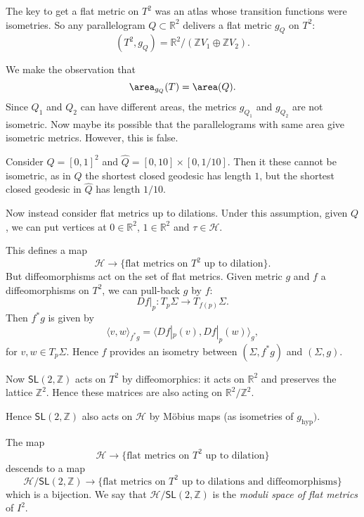 \documentclass[12pt]{article}
\begin{document}
The key to get a flat metric on $T^2$ was an atlas whose transition functions were isometries. So any parallelogram $Q \subset \mathbb{R}^2$ delivers a flat metric $g_Q$ on $T^2$:
\[
	(T^2, g_Q) = \mathbb{R}^2/(\mathbb{Z} V_1 \oplus \mathbb{Z} V_2).
\]

We make the observation that
\[
	\area_{g_Q}(T) = \area(Q).
\]
Since $Q_1$ and $Q_2$ can have different areas, the metrics $g_{Q_1}$ and $g_{Q_2}$ are not isometric. Now maybe its possible that the parallelograms with same area give isometric metrics. However, this is false.%

Consider $Q = [0, 1]^2$ and $\hat Q = [0, 10] \times [0, 1/10]$. Then it these cannot be isometric, as in $Q$ the shortest closed geodesic has length $1$, but the shortest closed geodesic in $\hat Q$ has length $1/10$.

Now instead consider flat metrics up to dilations. Under this assumption, given $Q$, we can put vertices at $0 \in \mathbb{R}^2$, $1 \in \mathbb{R}^2$ and $\tau \in \mathcal{H}$.

This defines a map
\[
	\mathcal{H} \to \{\text{flat metrics on } T^2 \text{ up to dilation}\}.
\]
But diffeomorphisms act on the set of flat metrics. Given metric $g$ and $f$ a diffeomorphisms on $T^2$, we can pull-back $g$ by $f$:
\[
	Df|_p : T_p \Sigma \to T_{f(p)}\Sigma.
\]
Then $f^{*}g$ is given by
\[
\langle v, w\rangle_{f^{*}g} = \langle Df|_p(v), Df|_p(w)\rangle_g,
\]
for $v, w \in T_p \Sigma$. Hence $f$ provides an isometry between $(\Sigma, f^{*}g)$ and $(\Sigma, g)$.

Now $\mathsf{SL}(2, \mathbb{Z})$ acts on $T^2$ by diffeomorphics: it acts on $\mathbb{R}^2$ and preserves the lattice $\mathbb{Z}^2$. Hence these matrices are also acting on $\mathbb{R}^2/\mathbb{Z}^2$.

Hence $\mathsf{SL}(2, \mathbb{Z})$ also acts on $\mathcal{H}$ by M\"{o}bius maps (as isometries of $g_\mathrm{hyp})$.

\begin{theorem}
	The map
	\[
		\mathcal{H} \to \{\text{flat metrics on } T^2 \text{ up to dilation}\}
	\]
	descends to a map
	\[
		\mathcal{H} / \mathsf{SL}(2, \mathbb{Z}) \to \{\text{flat metrics on } T^2 \text{ up to dilations and diffeomorphisms}\}
	\]
	which is a bijection. We say that $\mathcal{H}/\mathsf{SL}(2, \mathbb{Z})$ is the \emph{moduli space of flat metrics} of $I^2$.
\end{theorem}


\newpage

\printindex
\end{document}
